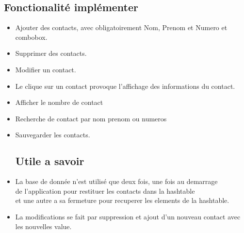 \documentclass[a4paper, 11pt]{article}
\begin{document}
\subsection{Fonctionalité implémenter}
\begin{itemize}[label=\textbullet, font=\normalsize]

\item Ajouter des contacts, avec obligatoirement Nom, Prenom et Numero et combobox.
\item Supprimer des contacts.
\item Modifier un contact.
\item Le clique sur un contact provoque l’affichage des informations du contact.
\item Afficher le nombre de contact
\item Recherche de contact par nom prenom ou numeros
\item  Sauvegarder les contacts.
\subsection{Utile a savoir}
\item La base de donnée n'est utilisé que deux fois, une fois au demarrage\\
de l'application pour restituer les contacts dans la hashtable\\
et une autre a sa fermeture pour recuperer les elements de la hashtable.\\

\item La modifications se fait par suppression et ajout d'un nouveau contact avec
les nouvelles value.\\ 


\end{itemize}
\newpage
\end{document}

